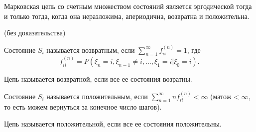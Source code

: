 \begin{theorem}
  Марковская цепь со счетным множеством состояний является эргодической тогда и только тогда,
  когда она неразложима, апериодична, возвратна и положительна.
\end{theorem}
(без доказательства)

\begin{definition}
  Состояние $S_i$ называется возвратным, если $\sum_{n=1}^{\infty} f_{ii}^{(n)} = 1$,
  где 
  \[
    f_{ii}^{(n)} = P(\xi_n = i, \xi_{n-1} \neq i, \dots, \xi_1 = i | \xi_0 = i).
  \]
\end{definition}

\begin{definition}
  Цепь называется возвратной, если все ее состояния возратны.
\end{definition}

\begin{definition}
  Состояние $S_i$ называется положительным, если $\sum_{n=1}^{\infty} n f_{ii}^{(n)} < \infty$
  (матож < $\infty$, то есть можем вернуться за конечное число шагов).
\end{definition}

\begin{definition}
  Цепь называется положительной, если все ее состояния положительны.
\end{definition}


